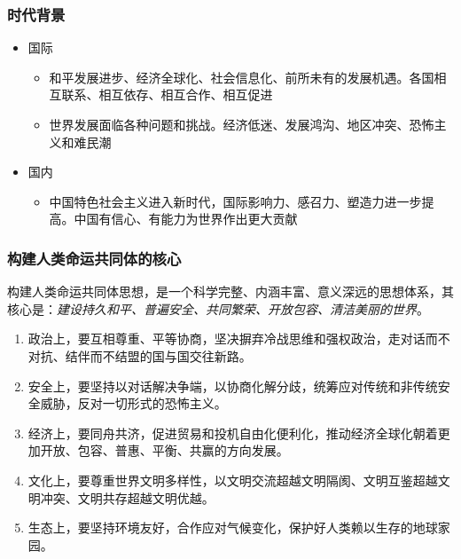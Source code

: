         \subsubsection{时代背景}
        \begin{itemize}
            \item 国际
            \begin{itemize}
                \item 和平发展进步、经济全球化、社会信息化、前所未有的发展机遇。各国相互联系、相互依存、相互合作、相互促进
                \item 世界发展面临各种问题和挑战。经济低迷、发展鸿沟、地区冲突、恐怖主义和难民潮
            \end{itemize}
            \item 国内
            \begin{itemize}
                \item 中国特色社会主义进入新时代，国际影响力、感召力、塑造力进一步提高。中国有信心、有能力为世界作出更大贡献
            \end{itemize}
        \end{itemize}

        \subsubsection{构建人类命运共同体的核心}
        构建人类命运共同体思想，是一个科学完整、内涵丰富、意义深远的思想体系，其核心是：\emph{建设持久和平、普遍安全、共同繁荣、开放包容、清洁美丽的世界}。
        \begin{enumerate}
            \item 政治上，要互相尊重、平等协商，坚决摒弃冷战思维和强权政治，走对话而不对抗、结伴而不结盟的国与国交往新路。
            \item 安全上，要坚持以对话解决争端，以协商化解分歧，统筹应对传统和非传统安全威胁，反对一切形式的恐怖主义。
            \item 经济上，要同舟共济，促进贸易和投机自由化便利化，推动经济全球化朝着更加开放、包容、普惠、平衡、共赢的方向发展。
            \item 文化上，要尊重世界文明多样性，以文明交流超越文明隔阂、文明互鉴超越文明冲突、文明共存超越文明优越。
            \item 生态上，要坚持环境友好，合作应对气候变化，保护好人类赖以生存的地球家园。
        \end{enumerate}

